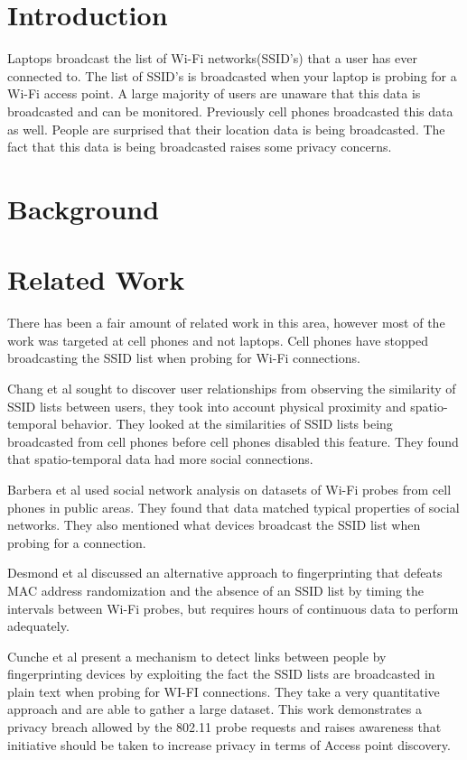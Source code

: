 \documentclass[letterpaper,twocolumn,10pt]{article}
\begin{document}
\section{Introduction}
Laptops broadcast the list of Wi-Fi networks(SSID's) that a user has ever connected to. The list of SSID's is broadcasted when your laptop is probing for a Wi-Fi access point. A large majority of users are unaware that this data is broadcasted and can be monitored. Previously cell phones broadcasted this data as well. People are surprised that their location data is being broadcasted. The fact that this data is being broadcasted raises some privacy concerns.

\section{Background}


\section{Related Work}
There has been a fair amount of related work in this area, however most of the work was targeted at cell phones and not laptops. Cell phones have stopped broadcasting the SSID list when probing for Wi-Fi connections.

Chang et al  sought to discover user relationships from observing the similarity of SSID lists between users, they took into account physical proximity and spatio-temporal behavior. They looked at the similarities of SSID lists being broadcasted from cell phones before cell phones disabled this feature. They found that spatio-temporal data had more social connections. 

Barbera et al  used social network analysis on datasets of Wi-Fi probes from cell phones in public areas. They found that data matched typical properties of social networks. They also mentioned what devices broadcast the SSID list when probing for a connection.

Desmond et al discussed an alternative approach to fingerprinting that defeats MAC address 
randomization and the absence of an SSID list by timing the intervals between Wi-Fi probes, but requires hours of continuous data to perform adequately.

Cunche et al  present a mechanism to detect links between people by fingerprinting devices by exploiting the fact the SSID lists are broadcasted in plain text when probing for WI-FI connections. They take a very quantitative approach and are able to gather a large dataset. This work demonstrates a privacy breach allowed by the 802.11 probe requests and raises awareness that initiative should be taken to increase privacy in terms of Access point discovery. 
\end{document}
